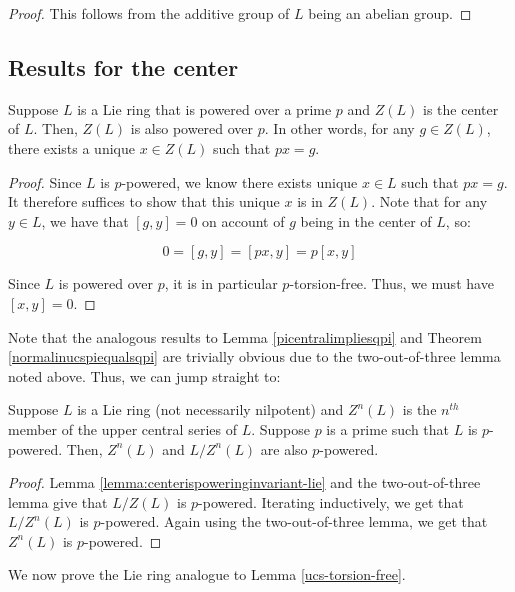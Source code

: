 \documentclass{ucetd}
\begin{document}
\begin{proof}
  This follows from the additive group of $L$ being an abelian group.
\end{proof}

\subsection{Results for the center}

\begin{lemma}\label{lemma:centerispoweringinvariant-lie}
  Suppose $L$ is a Lie ring that is powered over a prime $p$ and
  $Z(L)$ is the center of $L$. Then, $Z(L)$ is also powered over
  $p$. In other words, for any $g \in Z(L)$, there exists a unique $x
  \in Z(L)$ such that $px = g$.
\end{lemma}

\begin{proof}
  Since $L$ is $p$-powered, we know there exists unique $x \in L$
  such that $px = g$. It therefore suffices to show that this unique
  $x$ is in $Z(L)$. Note that for any $y \in L$, we have that $[g,y] =
  0$ on account of $g$ being in the center of $L$, so:

  $$0 = [g,y] = [px,y] = p[x,y]$$

  Since $L$ is powered over $p$, it is in particular
  $p$-torsion-free. Thus, we must have $[x,y] = 0$.
\end{proof}

Note that the analogous results to Lemma \ref{picentralimpliesqpi} and
Theorem \ref{normalinucspiequalsqpi} are trivially obvious due to the
two-out-of-three lemma noted above. Thus, we can jump straight to:

\begin{theorem}\label{thm:ucsqpi-lie}
  Suppose $L$ is a Lie ring (not necessarily nilpotent) and $Z^n(L)$ is
  the $n^{th}$ member of the upper central series of $L$. Suppose $p$
  is a prime such that $L$ is $p$-powered. Then, $Z^n(L)$ and
  $L/Z^n(L)$ are also $p$-powered.
\end{theorem}

\begin{proof}
  Lemma \ref{lemma:centerispoweringinvariant-lie} and the two-out-of-three
  lemma give that $L/Z(L)$ is $p$-powered. Iterating inductively, we
  get that $L/Z^n(L)$ is $p$-powered. Again using the two-out-of-three
  lemma, we get that $Z^n(L)$ is $p$-powered.
\end{proof}

We now prove the Lie ring analogue to Lemma \ref{ucs-torsion-free}.
\end{document}
